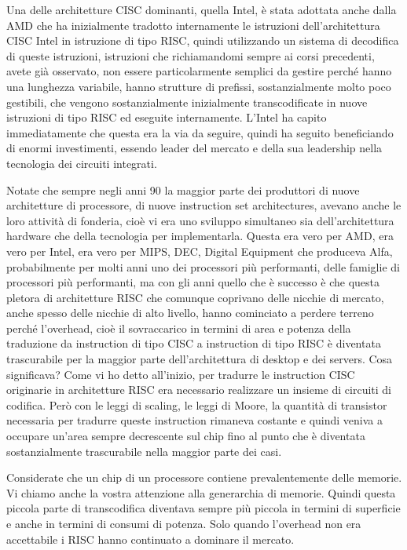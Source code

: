 Una delle architetture CISC dominanti, quella Intel, è stata adottata anche dalla AMD che ha inizialmente tradotto internamente le istruzioni dell'architettura CISC Intel in istruzione di tipo RISC, quindi utilizzando un sistema di decodifica di queste istruzioni, istruzioni che richiamandomi sempre ai corsi precedenti, avete già osservato, non essere particolarmente semplici da gestire perché hanno una lunghezza variabile, hanno strutture di prefissi, sostanzialmente molto poco gestibili, che vengono sostanzialmente inizialmente transcodificate in nuove istruzioni di tipo RISC ed eseguite internamente.
L'Intel ha capito immediatamente che questa era la via da seguire, quindi ha seguito beneficiando di enormi investimenti, essendo leader del mercato e della sua leadership nella tecnologia dei circuiti integrati.

Notate che sempre negli anni 90 la maggior parte dei produttori di nuove architetture di processore, di nuove instruction set architectures, avevano anche le loro attività di fonderia, cioè vi era uno sviluppo simultaneo sia dell'architettura hardware che della tecnologia per implementarla.
Questa era vero per AMD, era vero per Intel, era vero per MIPS, DEC, Digital Equipment che produceva Alfa, probabilmente per molti anni uno dei processori più performanti, delle famiglie di processori più performanti, ma con gli anni quello che è successo è che questa pletora di architetture RISC che comunque coprivano delle nicchie di mercato, anche spesso delle nicchie di alto livello, hanno cominciato a perdere terreno perché l'overhead, cioè il sovraccarico in termini di area e potenza della traduzione da instruction di tipo CISC a instruction di tipo RISC è diventata trascurabile per la maggior parte dell'architettura di desktop e dei servers.
Cosa significava?
Come vi ho detto all'inizio, per tradurre le instruction CISC originarie in architetture RISC era necessario realizzare un insieme di circuiti di codifica.
Però con le leggi di scaling, le leggi di Moore, la quantità di transistor necessaria per tradurre queste instruction rimaneva costante e quindi veniva a occupare un'area sempre decrescente sul chip fino al punto che è diventata sostanzialmente trascurabile nella maggior parte dei casi.

Considerate che un chip di un processore contiene prevalentemente delle memorie.
Vi chiamo anche la vostra attenzione alla generarchia di memorie.
Quindi questa piccola parte di transcodifica diventava sempre più piccola in termini di superficie e anche in termini di consumi di potenza.
Solo quando l'overhead non era accettabile i RISC hanno continuato a dominare il mercato.

